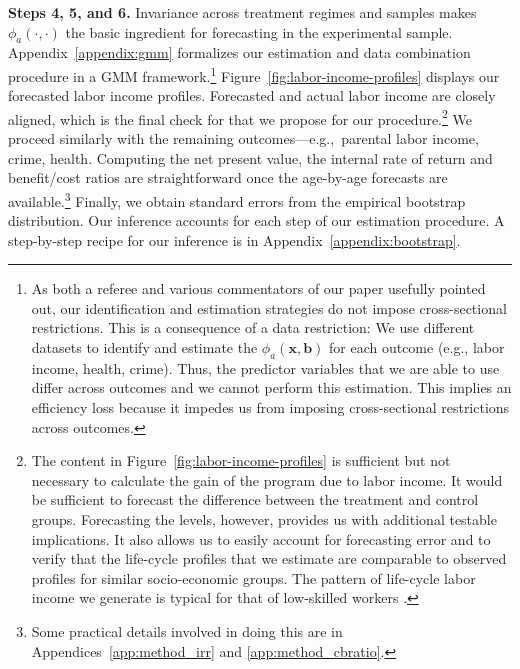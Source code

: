 \noindent \textbf{Steps 4, 5, and 6.} \label{section:following} Invariance across treatment regimes and samples makes $\phi_{a} (\cdot, \cdot)$ the basic ingredient for forecasting in the experimental sample. Appendix~\ref{appendix:gmm} formalizes our estimation and data combination procedure in a GMM framework.\footnote{As both a referee and various commentators of our paper usefully pointed out, our identification and estimation strategies do not impose cross-sectional restrictions. This is a consequence of a data restriction: We use different datasets to identify and estimate the  $\phi_{a} \left( \bm{x}, \bm{b} \right)$ for each outcome (e.g., labor income, health, crime). Thus, the predictor variables that we are able to use differ across outcomes and we cannot perform this estimation. This implies an efficiency loss because it impedes us from imposing cross-sectional restrictions across outcomes.} Figure~\ref{fig:labor-income-profiles} displays our forecasted labor income profiles. Forecasted and actual labor income are closely aligned, which is the final check for that we propose for our procedure.\footnote{The content in Figure~\ref{fig:labor-income-profiles} is sufficient but not necessary to calculate the gain of the program due to labor income. It would be sufficient to forecast the difference between the treatment and control groups. Forecasting the levels, however, provides us with additional testable implications. It also allows us to easily account for forecasting error and to verify that the life-cycle profiles that we estimate are comparable to observed profiles for similar socio-economic groups. The pattern of life-cycle labor income we generate is typical for that of low-skilled workers \citep{Blundell-etal_2015_J-Pub-E,Gladden_Taber_2000_WageProgression,Sanders-Taber_2012_AR,Lagakos_Moll_etal_2016_LifeCycle_NBER}.} We proceed similarly with the remaining outcomes---e.g.,\ parental labor income, crime, health. Computing the net present value, the internal rate of return and benefit/cost ratios are straightforward once the age-by-age forecasts are available.\footnote{Some practical details involved in doing this are in Appendices~\ref{app:method_irr} and \ref{app:method_cbratio}.} Finally, we obtain standard errors from the empirical bootstrap distribution. Our inference accounts for each step of our estimation procedure. A step-by-step recipe for our inference is in Appendix~\ref{appendix:bootstrap}.

